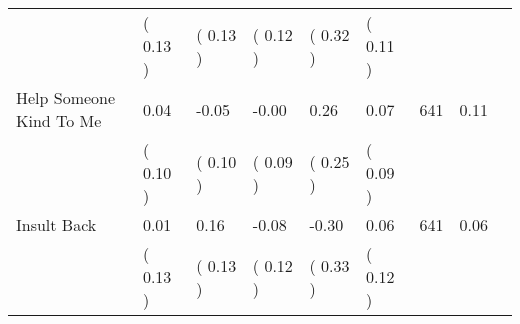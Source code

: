 \begin{tabular}{L{6.2cm} C{1.8cm} C{1.8cm} C{1.8cm} C{1.8cm} C{1.8cm} C{1.8cm} C{0.3cm} C{0.3cm}}
 & (     0.13 ) & (     0.13 ) & (     0.12 ) & (     0.32 ) & (     0.11 )  & \\
Help Someone Kind To Me &      0.04 &     -0.05 &     -0.00 &      0.26 &      0.07  & 641 &       0.11 \\ 
 & (     0.10 ) & (     0.10 ) & (     0.09 ) & (     0.25 ) & (     0.09 )  & \\
Insult Back &      0.01 &      0.16 &     -0.08 &     -0.30 &      0.06  & 641 &       0.06 \\ 
 & (     0.13 ) & (     0.13 ) & (     0.12 ) & (     0.33 ) & (     0.12 )  & \\
\bottomrule
\end{tabular}
